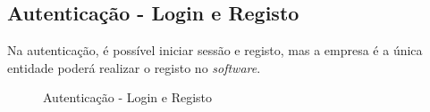 \newpage

\subsection{Autenticação - Login e Registo}

Na autenticação, é possível iniciar sessão e registo, mas a empresa é a única entidade poderá realizar o registo no \textit{software}.

\begin{figure}[htb]%
  \centering
  \qquad
  \caption{Autenticação - Login e Registo}%
  \label{fig:24}
\end{figure}

